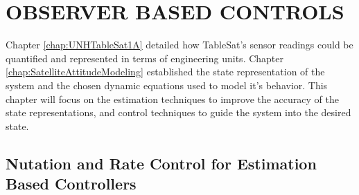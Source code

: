 
\chapter{OBSERVER BASED CONTROLS}
\label{chap:ObserverBasedControls}

Chapter \ref{chap:UNHTableSat1A} detailed how TableSat's sensor readings could be quantified and represented in terms of engineering units.  Chapter \ref{chap:SatelliteAttitudeModeling} established the state representation of the system and the chosen dynamic equations used to model it's behavior.  This chapter will focus on the estimation techniques to improve the accuracy of the state representations, and control techniques to guide the system into the desired state.

\section{Nutation and Rate Control for Estimation Based Controllers}
\label{sec:NutationandRateControlforEstimationBasedControllers}


